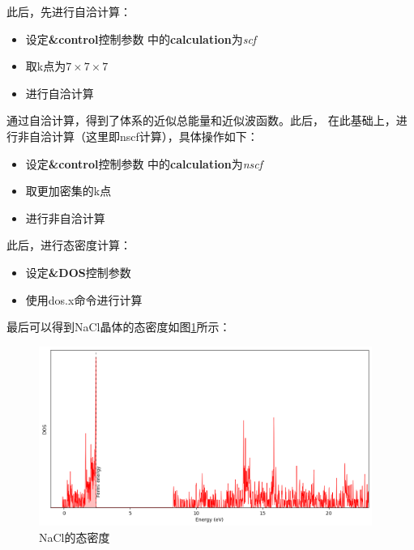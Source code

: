 \documentclass[UTF8]{ctexart}
\numberwithin{figure}{section}  %
\numberwithin{table}{section}
\numberwithin{equation}{section}
\begin{document}
            此后，先进行自洽计算：
    
            \begin{itemize}
                \item 设定\textbf{\&control}控制参数
                中的\textbf{calculation}为\emph{scf}
                \item 取k点为$7\times 7\times 7$
                \item 进行自洽计算
            \end{itemize}
    
            通过自洽计算，得到了体系的近似总能量和近似波函数。此后，
        在此基础上，进行非自洽计算（这里即nscf计算），具体操作如下：
    
            \begin{itemize}
                \item 设定\textbf{\&control}控制参数
                中的\textbf{calculation}为\emph{nscf}
                \item 取更加密集的k点
                \item 进行非自洽计算
            \end{itemize}
    
            此后，进行态密度计算：

            \begin{itemize}
                \item 设定\textbf{\&DOS}控制参数
                \item 使用dos.x命令进行计算
            \end{itemize}

            最后可以得到NaCl晶体的态密度如图\ref{Fig:6}所示：

            \begin{figure}[H]
                \centering
                \includegraphics[width=0.97\textwidth]{dos.png}
                \caption{NaCl的态密度}
                \label{Fig:6}
            \end{figure}
\end{document}
